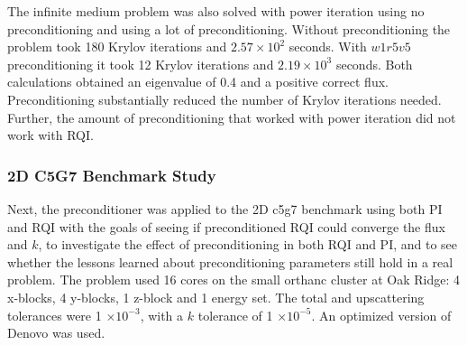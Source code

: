 The infinite medium problem was also solved with power iteration using no preconditioning and using a lot of preconditioning. Without preconditioning the problem took 180 Krylov iterations and $2.57 \times 10^{2}$ seconds. With $w1r5v5$ preconditioning it took 12 Krylov iterations and $2.19 \times 10^{3}$ seconds. Both calculations obtained an eigenvalue of 0.4 and a positive correct flux. Preconditioning substantially reduced the number of Krylov iterations needed. Further, the amount of preconditioning that worked with power iteration did not work with RQI. 

\subsubsection{2D C5G7 Benchmark Study}
Next, the preconditioner was applied to the 2D c5g7 benchmark using both PI and RQI with the goals of seeing if preconditioned RQI could converge the flux and $k$, to investigate the effect of preconditioning in both RQI and PI, and to see whether the lessons learned about preconditioning parameters still hold in a real problem. The problem used 16 cores on the small orthanc cluster at Oak Ridge: 4 x-blocks, 4 y-blocks, 1 z-block and 1 energy set. The total and upscattering tolerances were 1 $\times 10^{-3}$, with a $k$ tolerance of 1 $\times 10^{-5}$. An optimized version of Denovo was used.  


